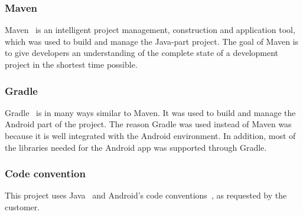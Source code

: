 \subsubsection{Maven}
Maven~\cite{maven} is an intelligent project management, construction and application tool, which was used to build and manage the Java-part project. The goal of Maven is to give developers an understanding of the complete state of a development project in the shortest time possible.

\subsubsection{Gradle}
Gradle~\cite{gradle} is in many ways similar to Maven. It was used to build and manage the Android part of the project. The reason Gradle was used instead of Maven was because it is well integrated with the Android environment. In addition, most of the libraries needed for the Android app was supported through Gradle.

\subsubsection{Code convention}
This project uses Java~\cite{javaconv} and Android's code conventions~\cite{androidconv}, as requested by the customer.

